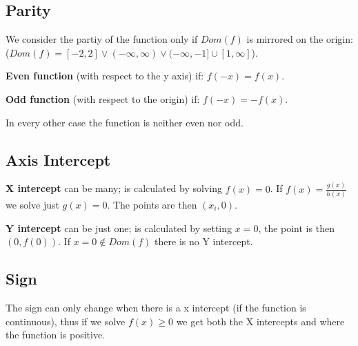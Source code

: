 \documentclass[8pt,a4paper]{extarticle}     %
\theoremstyle{definition}
\theoremstyle{definition}
\theoremstyle{definition}
\begin{document}
\begin{multicols}{4}
\subsection{Parity}
We consider the partiy of the function only if $Dom(f)$ is mirrored on the origin: \\ ($Dom(f) = [-2,2] \lor (-\infty, \infty) \lor (-\infty, -1] \cup [1, \infty]$).
\begin{bulletlist}
	\item \textbf{Even function} (with respect to the y axis) if: $f(-x)=f(x)$.
	\item \textbf{Odd function} (with respect to the origin) if: $f(-x)=-f(x)$.
	\item In every other case the function is neither even nor odd.
\end{bulletlist}
\subsection{Axis Intercept}
\begin{bulletlist}
	\item \textbf{X intercept} can be many; is calculated by solving $f(x) = 0$. If $f(x) = \frac{g(x)}{h(x)}$ we solve just $g(x)=0$. The points are then $(x_i,0)$.
	\item \textbf{Y intercept} can be just one; is calculated by setting $x=0$, the point is then $(0, f(0))$. If $x=0\notin Dom(f)$ there is no Y intercept.
\end{bulletlist}
\subsection{Sign}
The sign can only change when there is a x intercept (if the function is continuous), thus if we solve $f(x) \geq 0$ we get both the X intercepts and where the function is positive.

\end{multicols}
\end{document}
